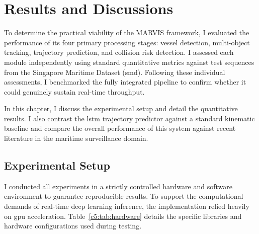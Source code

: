 
\chapter{Results and Discussions}

To determine the practical viability of the MARVIS framework, I evaluated the performance of its four primary processing stages: vessel detection, multi-object tracking, trajectory prediction, and collision risk detection. I assessed each module independently using standard quantitative metrics against test sequences from the Singapore Maritime Dataset (\gls{smd}). Following these individual assessments, I benchmarked the fully integrated pipeline to confirm whether it could genuinely sustain real-time throughput. 

In this chapter, I discuss the experimental setup and detail the quantitative results. I also contrast the \gls{lstm} trajectory predictor against a standard kinematic baseline and compare the overall performance of this system against recent literature in the maritime surveillance domain.

\section{Experimental Setup}

I conducted all experiments in a strictly controlled hardware and software environment to guarantee reproducible results. To support the computational demands of real-time deep learning inference, the implementation relied heavily on \gls{gpu} acceleration. Table~\ref{c5:tab:hardware} details the specific libraries and hardware configurations used during testing.


